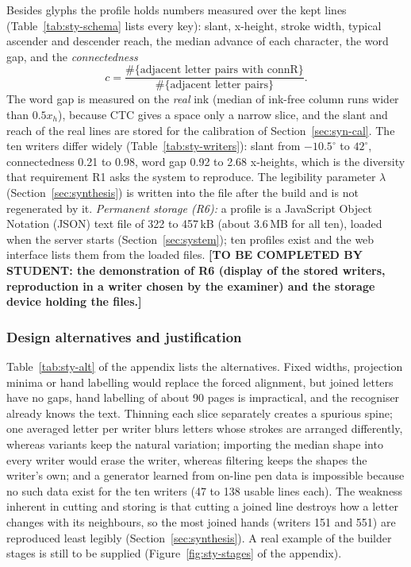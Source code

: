 Besides glyphs the profile holds numbers measured over the kept lines (Table~\ref{tab:sty-schema} lists every key): slant, x-height, stroke width, typical ascender and descender reach, the median advance of each character, the word gap, and the \emph{connectedness}
\begin{equation}
c=\frac{\#\{\text{adjacent letter pairs with }\mathrm{connR}\}}{\#\{\text{adjacent letter pairs}\}}.
\label{eq:sty-conn}
\end{equation}
The word gap is measured on the \emph{real} ink (median of ink-free column runs wider than $0.5x_h$), because CTC gives a space only a narrow slice, and the slant and reach of the real lines are stored for the calibration of Section~\ref{sec:syn-cal}.
The ten writers differ widely (Table~\ref{tab:sty-writers}): slant from $-10.5^\circ$ to $42^\circ$, connectedness 0.21 to 0.98, word gap 0.92 to 2.68 x-heights, which is the diversity that requirement R1 asks the system to reproduce.
The legibility parameter $\lambda$ (Section~\ref{sec:synthesis}) is written into the file after the build and is not regenerated by it.
\emph{Permanent storage (R6):} a profile is a JavaScript Object Notation (JSON) text file of 322 to 457\,kB (about 3.6\,MB for all ten), loaded when the server starts (Section~\ref{sec:system}); ten profiles exist and the web interface lists them from the loaded files.
\textbf{[TO BE COMPLETED BY STUDENT: the demonstration of R6 (display of the stored writers, reproduction in a writer chosen by the examiner) and the storage device holding the files.]}

\subsubsection{Design alternatives and justification}

Table~\ref{tab:sty-alt} of the appendix lists the alternatives.
Fixed widths, projection minima or hand labelling would replace the forced alignment, but joined letters have no gaps, hand labelling of about 90 pages is impractical, and the recogniser already knows the text.
Thinning each slice separately creates a spurious spine; one averaged letter per writer blurs letters whose strokes are arranged differently, whereas variants keep the natural variation; importing the median shape into every writer would erase the writer, whereas filtering keeps the shapes the writer's own; and a generator learned from on-line pen data is impossible because no such data exist for the ten writers (47 to 138 usable lines each).
The weakness inherent in cutting and storing is that cutting a joined line destroys how a letter changes with its neighbours, so the most joined hands (writers 151 and 551) are reproduced least legibly (Section~\ref{sec:synthesis}).
A real example of the builder stages is still to be supplied (Figure~\ref{fig:sty-stages} of the appendix).
